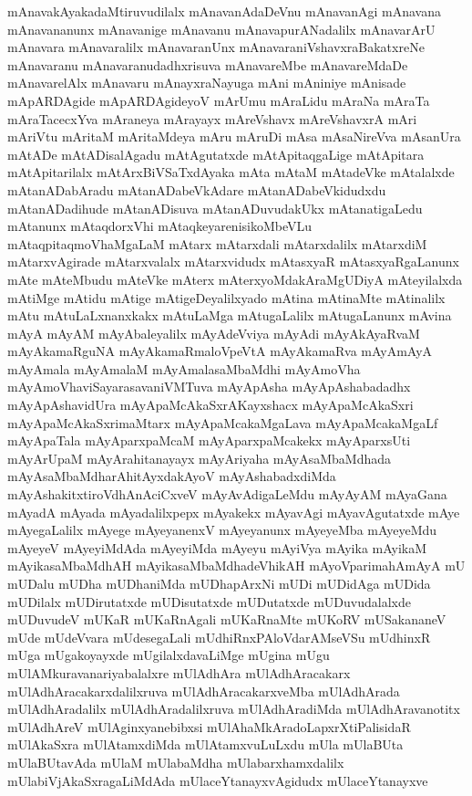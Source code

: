 {mAnavakAyakadaMtiruvudilalx
mAnavanAdaDeVnu
mAnavanAgi
mAnavana
mAnavananunx
mAnavanige
mAnavanu
mAnavapurANadalilx
mAnavarArU
mAnavara
mAnavaralilx
mAnavaranUnx
mAnavaraniVshavxraBakatxreNe
mAnavaranu
mAnavaranudadhxrisuva
mAnavareMbe
mAnavareMdaDe
mAnavarelAlx
mAnavaru
mAnayxraNayuga
mAni
mAniniye
mAnisade
mApARDAgide
mApARDAgideyoV
mArUmu
mAraLidu
mAraNa
mAraTa
mAraTacecxYva
mAraneya
mArayayx
mAreVshavx
mAreVshavxrA
mAri
mAriVtu
mAritaM
mAritaMdeya
mAru
mAruDi
mAsa
mAsaNireVva
mAsanUra
mAtADe
mAtADisalAgadu
mAtAgutatxde
mAtApitaqgaLige
mAtApitara
mAtApitarilalx
mAtArxBiVSaTxdAyaka
mAta
mAtaM
mAtadeVke
mAtalalxde
mAtanADabAradu
mAtanADabeVkAdare
mAtanADabeVkidudxdu
mAtanADadihude
mAtanADisuva
mAtanADuvudakUkx
mAtanatigaLedu
mAtanunx
mAtaqdorxVhi
mAtaqkeyarenisikoMbeVLu
mAtaqpitaqmoVhaMgaLaM
mAtarx
mAtarxdali
mAtarxdalilx
mAtarxdiM
mAtarxvAgirade
mAtarxvalalx
mAtarxvidudx
mAtasxyaR
mAtasxyaRgaLanunx
mAte
mAteMbudu
mAteVke
mAterx
mAterxyoMdakAraMgUDiyA
mAteyilalxda
mAtiMge
mAtidu
mAtige
mAtigeDeyalilxyado
mAtina
mAtinaMte
mAtinalilx
mAtu
mAtuLaLxnanxkakx
mAtuLaMga
mAtugaLalilx
mAtugaLanunx
mAvina
mAyA
mAyAM
mAyAbaleyalilx
mAyAdeVviya
mAyAdi
mAyAkAyaRvaM
mAyAkamaRguNA
mAyAkamaRmaloVpeVtA
mAyAkamaRva
mAyAmAyA
mAyAmala
mAyAmalaM
mAyAmalasaMbaMdhi
mAyAmoVha
mAyAmoVhaviSayarasavaniVMTuva
mAyApAsha
mAyApAshabadadhx
mAyApAshavidUra
mAyApaMcAkaSxrAKayxshacx
mAyApaMcAkaSxri
mAyApaMcAkaSxrimaMtarx
mAyApaMcakaMgaLava
mAyApaMcakaMgaLf
mAyApaTala
mAyAparxpaMcaM
mAyAparxpaMcakekx
mAyAparxsUti
mAyArUpaM
mAyArahitanayayx
mAyAriyaha
mAyAsaMbaMdhada
mAyAsaMbaMdharAhitAyxdakAyoV
mAyAshabadxdiMda
mAyAshakitxtiroVdhAnAciCxveV
mAyAvAdigaLeMdu
mAyAyAM
mAyaGana
mAyadA
mAyada
mAyadalilxpepx
mAyakekx
mAyavAgi
mAyavAgutatxde
mAye
mAyegaLalilx
mAyege
mAyeyanenxV
mAyeyanunx
mAyeyeMba
mAyeyeMdu
mAyeyeV
mAyeyiMdAda
mAyeyiMda
mAyeyu
mAyiVya
mAyika
mAyikaM
mAyikasaMbaMdhAH
mAyikasaMbaMdhadeVhikAH
mAyoVparimahAmAyA
mU
mUDalu
mUDha
mUDhaniMda
mUDhapArxNi
mUDi
mUDidAga
mUDida
mUDilalx
mUDirutatxde
mUDisutatxde
mUDutatxde
mUDuvudalalxde
mUDuvudeV
mUKaR
mUKaRnAgali
mUKaRnaMte
mUKoRV
mUSakananeV
mUde
mUdeVvara
mUdesegaLali
mUdhiRnxPAloVdarAMseVSu
mUdhinxR
mUga
mUgakoyayxde
mUgilalxdavaLiMge
mUgina
mUgu
mUlAMkuravanariyabalalxre
mUlAdhAra
mUlAdhAracakarx
mUlAdhAracakarxdalilxruva
mUlAdhAracakarxveMba
mUlAdhArada
mUlAdhAradalilx
mUlAdhAradalilxruva
mUlAdhAradiMda
mUlAdhAravanotitx
mUlAdhAreV
mUlAginxyanebibxsi
mUlAhaMkAradoLapxrXtiPalisidaR
mUlAkaSxra
mUlAtamxdiMda
mUlAtamxvuLuLxdu
mUla
mUlaBUta
mUlaBUtavAda
mUlaM
mUlabaMdha
mUlabarxhamxdalilx
mUlabiVjAkaSxragaLiMdAda
mUlaceYtanayxvAgidudx
mUlaceYtanayxve
}

